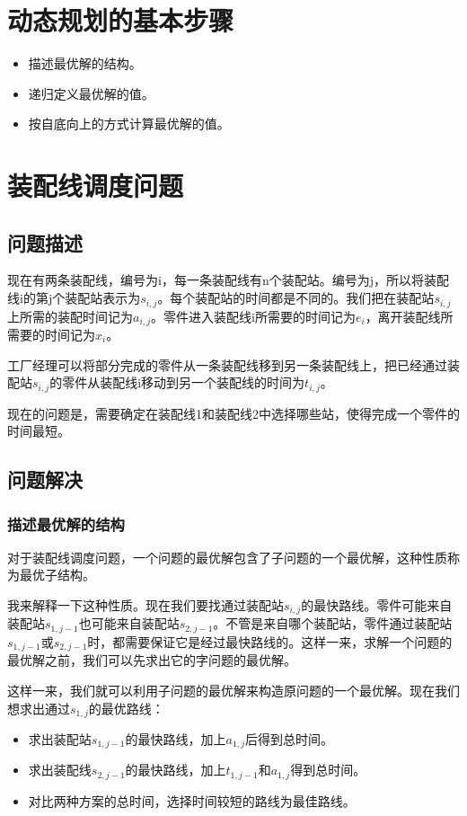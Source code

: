 \documentclass[a4paper,left=2.5cm,right=2.5cm,11pt]{article}
\begin{document}
\section{动态规划的基本步骤}
\begin{itemize}
	\item 描述最优解的结构。
	\item 递归定义最优解的值。
	\item 按自底向上的方式计算最优解的值。
\end{itemize}

\section{装配线调度问题}
\subsection{问题描述}
	现在有两条装配线，编号为i，每一条装配线有n个装配站。编号为j，所以将装配线i的第j个装配站表示为$s_{i,j}$。每个装配站的时间都是不同的。我们把在装配站$s_{i,j}$上所需的装配时间记为$a_{i,j}$。零件进入装配线i所需要的时间记为$e_i$，离开装配线所需要的时间记为$x_i$。\par
	工厂经理可以将部分完成的零件从一条装配线移到另一条装配线上，把已经通过装配站$s_{i,j}$的零件从装配线i移动到另一个装配线的时间为$t_{i,j}$。\par
	现在的问题是，需要确定在装配线1和装配线2中选择哪些站，使得完成一个零件的时间最短。
\subsection{问题解决}
\subsubsection{描述最优解的结构}
	对于装配线调度问题，一个问题的最优解包含了子问题的一个最优解，这种性质称为最优子结构。\par
	我来解释一下这种性质。现在我们要找通过装配站$s_{i,j}$的最快路线。零件可能来自装配站$s_{1,j-1}$也可能来自装配站$s_{2,j-1}$。不管是来自哪个装配站，零件通过装配站$s_{1,j-1}$或$s_{2,j-1}$时，都需要保证它是经过最快路线的。这样一来，求解一个问题的最优解之前，我们可以先求出它的字问题的最优解。\par
	这样一来，我们就可以利用子问题的最优解来构造原问题的一个最优解。现在我们想求出通过$s_{1,j}$的最优路线：
	\begin{itemize}
		\item 求出装配站$s_{1,j-1}$的最快路线，加上$a_{1,j}$后得到总时间。
		\item 求出装配线$s_{2,j-1}$的最快路线，加上$t_{1,j-1}$和$a_{1,j}$得到总时间。
		\item 对比两种方案的总时间，选择时间较短的路线为最佳路线。
	\end{itemize}
\end{document}

